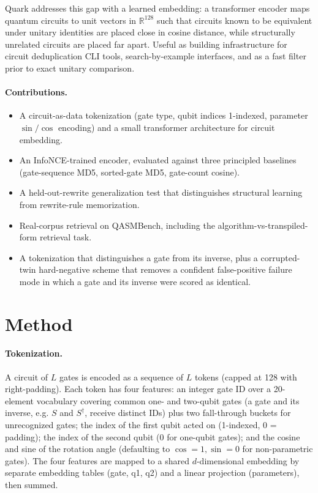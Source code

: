 \documentclass[11pt]{article}
\begin{document}
Quark addresses this gap with a learned embedding: a transformer encoder maps quantum circuits to unit vectors in $\mathbb{R}^{128}$ such that circuits known to be equivalent under unitary identities are placed close in cosine distance, while structurally unrelated circuits are placed far apart. Useful as building infrastructure for circuit deduplication CLI tools, search-by-example interfaces, and as a fast filter prior to exact unitary comparison.

\paragraph{Contributions.}
\begin{itemize}[topsep=2pt,itemsep=2pt]
    \item A circuit-as-data tokenization (gate type, qubit indices 1-indexed, parameter $\sin/\cos$ encoding) and a small transformer architecture for circuit embedding.
    \item An InfoNCE-trained encoder, evaluated against three principled baselines (gate-sequence MD5, sorted-gate MD5, gate-count cosine).
    \item A held-out-rewrite generalization test that distinguishes structural learning from rewrite-rule memorization.
    \item Real-corpus retrieval on QASMBench, including the algorithm-vs-transpiled-form retrieval task.
    \item A tokenization that distinguishes a gate from its inverse, plus a corrupted-twin hard-negative scheme that removes a confident false-positive failure mode in which a gate and its inverse were scored as identical.
\end{itemize}

\section{Method}

\paragraph{Tokenization.} A circuit of $L$ gates is encoded as a sequence of $L$ tokens (capped at 128 with right-padding). Each token has four features: an integer gate ID over a 20-element vocabulary covering common one- and two-qubit gates (a gate and its inverse, e.g. $S$ and $S^\dagger$, receive distinct IDs) plus two fall-through buckets for unrecognized gates; the index of the first qubit acted on (1-indexed, 0 = padding); the index of the second qubit (0 for one-qubit gates); and the cosine and sine of the rotation angle (defaulting to $\cos = 1, \sin = 0$ for non-parametric gates). The four features are mapped to a shared $d$-dimensional embedding by separate embedding tables (gate, q1, q2) and a linear projection (parameters), then summed.
\end{document}
